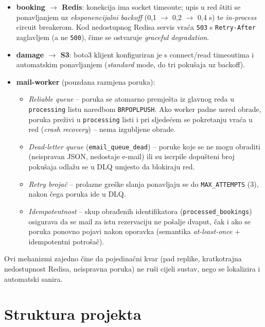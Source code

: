 \documentclass[12pt,a4paper]{article}
\begin{document}
\begin{itemize}
  \item \textbf{booking $\rightarrow$ Redis}: konekcija ima socket timeoute; upis u red štiti se ponavljanjem uz \emph{eksponencijalni backoff} (0,1 $\rightarrow$ 0,2 $\rightarrow$ 0,4 s) te \emph{in-process} circuit breakerom. Kod nedostupnog Redisa servis vraća \texttt{503} s \texttt{Retry-After} zaglavljem (a ne \texttt{500}), čime se ostvaruje \emph{graceful degradation}.
  \item \textbf{damage $\rightarrow$ S3}: boto3 klijent konfiguriran je s connect/read timeoutima i automatskim ponavljanjem (\emph{standard} mode, do tri pokušaja uz backoff).
  \item \textbf{mail-worker} (pouzdana razmjena poruka):
  \begin{itemize}
    \item \emph{Reliable queue} -- poruka se atomarno premješta iz glavnog reda u \texttt{processing} listu naredbom \texttt{BRPOPLPUSH}. Ako worker padne usred obrade, poruka preživi u \texttt{processing} listi i pri sljedećem se pokretanju vraća u red (\emph{crash recovery}) -- nema izgubljene obrade.
    \item \emph{Dead-letter queue} (\texttt{email\_queue\_dead}) -- poruke koje se ne mogu obraditi (neispravan JSON, nedostaje e-mail) ili su iscrpile dopušteni broj pokušaja odlažu se u DLQ umjesto da blokiraju red.
    \item \emph{Retry brojač} -- prolazne greške slanja ponavljaju se do \texttt{MAX\_ATTEMPTS} (3), nakon čega poruka ide u DLQ.
    \item \emph{Idempotentnost} -- skup obrađenih identifikatora (\texttt{processed\_bookings}) osigurava da se mail za istu rezervaciju ne pošalje dvaput, čak i ako se poruka ponovno pojavi nakon oporavka (semantika \emph{at-least-once} + idempotentni potrošač).
  \end{itemize}
\end{itemize}

Ovi mehanizmi zajedno čine da pojedinačni kvar (pad replike, kratkotrajna nedostupnost Redisa, neispravna poruka) ne ruši cijeli sustav, nego se lokalizira i automatski sanira.

\section{Struktura projekta}
\end{document}
